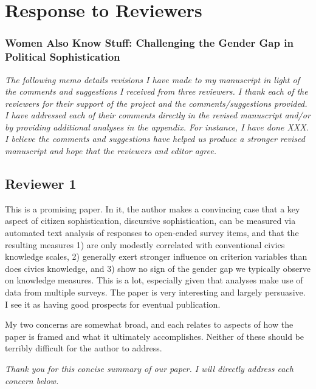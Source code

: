 \clearpage
\singlespacing
\setcounter{page}{1}
\setcounter{footnote}{0}
\setlength{\parskip}{1em}
\setlength{\parindent}{0cm}
\section*{Response to Reviewers}
\subsubsection*{Women Also Know Stuff: Challenging the Gender Gap in Political Sophistication}
\startcontents[memo]

\textit{The following memo details revisions I have made to my manuscript in light of the comments and suggestions I received from three reviewers.  I thank each of the reviewers for their support of the project and the comments/suggestions provided. I have addressed each of their comments directly in the revised manuscript and/or by providing additional analyses in the appendix.  For instance, I have done XXX. I believe the comments and suggestions have helped us produce a stronger revised manuscript and hope that the reviewers and editor agree.}



\subsection*{Reviewer 1}

This is a promising paper. In it, the author makes a convincing case that a key aspect of citizen sophistication, discursive sophistication, can be measured via automated text analysis of responses to open-ended survey items, and that the resulting measures 1) are only modestly correlated with conventional civics knowledge scales, 2) generally exert stronger influence on criterion variables than does civics knowledge, and 3) show no sign of the gender gap we typically observe on knowledge measures. This is a lot, especially given that analyses make use of data from multiple surveys. The paper is very interesting and largely persuasive. I see it as having good prospects for eventual publication.

My two concerns are somewhat broad, and each relates to aspects of how the paper is framed and what it ultimately accomplishes. Neither of these should be terribly difficult for the author to address.

\textit{Thank you for this concise summary of our paper. I will directly address each concern below.}


